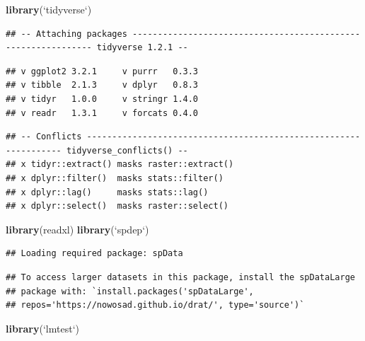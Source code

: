 \documentclass[11pt,]{article}
\newenvironment{Shaded}{\begin{snugshade}}{\end{snugshade}}
\newcommand{\KeywordTok}[1]{\textcolor[rgb]{0.13,0.29,0.53}{\textbf{#1}}}
\newcommand{\DataTypeTok}[1]{\textcolor[rgb]{0.13,0.29,0.53}{#1}}
\newcommand{\StringTok}[1]{\textcolor[rgb]{0.31,0.60,0.02}{#1}}
\newcommand{\NormalTok}[1]{#1}
\begin{document}
\begin{Shaded}
\begin{Highlighting}[]
\KeywordTok{library}\NormalTok{(}\StringTok{`}\DataTypeTok{tidyverse}\StringTok{`}\NormalTok{)}
\end{Highlighting}
\end{Shaded}

\begin{verbatim}
## -- Attaching packages -------------------------------------------------------------- tidyverse 1.2.1 --
\end{verbatim}

\begin{verbatim}
## v ggplot2 3.2.1     v purrr   0.3.3
## v tibble  2.1.3     v dplyr   0.8.3
## v tidyr   1.0.0     v stringr 1.4.0
## v readr   1.3.1     v forcats 0.4.0
\end{verbatim}

\begin{verbatim}
## -- Conflicts ----------------------------------------------------------------- tidyverse_conflicts() --
## x tidyr::extract() masks raster::extract()
## x dplyr::filter()  masks stats::filter()
## x dplyr::lag()     masks stats::lag()
## x dplyr::select()  masks raster::select()
\end{verbatim}

\begin{Shaded}
\begin{Highlighting}[]
\KeywordTok{library}\NormalTok{(readxl)}
\KeywordTok{library}\NormalTok{(}\StringTok{`}\DataTypeTok{spdep}\StringTok{`}\NormalTok{)}
\end{Highlighting}
\end{Shaded}

\begin{verbatim}
## Loading required package: spData
\end{verbatim}

\begin{verbatim}
## To access larger datasets in this package, install the spDataLarge
## package with: `install.packages('spDataLarge',
## repos='https://nowosad.github.io/drat/', type='source')`
\end{verbatim}

\begin{Shaded}
\begin{Highlighting}[]
\KeywordTok{library}\NormalTok{(}\StringTok{`}\DataTypeTok{lmtest}\StringTok{`}\NormalTok{)}
\end{Highlighting}
\end{Shaded}
\end{document}

